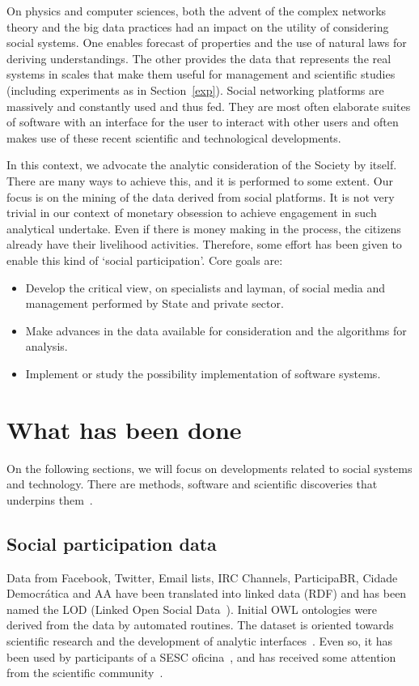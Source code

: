 \documentclass[letterpaper,10pt]{article}
\begin{document}
On physics and computer sciences,
both the advent of the complex networks
theory and the big data practices
had an impact on the utility of considering
social systems.
One enables forecast of properties
and the use of natural laws for deriving understandings.
The other provides the data that represents the real systems
in scales that make them useful for management and
scientific studies (including experiments as in Section~\ref{exp}).
Social networking platforms are massively and constantly used and thus fed.
They are most often elaborate suites of software with
an interface for the user to interact with other users
and often makes use of these recent scientific and technological
developments.

In this context,
we advocate the analytic consideration
of the Society by itself.
There are many ways to achieve this,
and it is performed to some extent.
Our focus is on the mining of the data
derived from social platforms.
It is not very trivial in our context
of monetary obsession to achieve engagement
in such analytical undertake.
Even if there is money making in the process,
the citizens already have their livelihood activities.
Therefore, some effort has been given to
enable this kind of `social participation'.
Core goals are:
\begin{itemize}
	\item Develop the critical view, on specialists and layman,
		of social media and
		management performed by State and private sector.
	\item Make advances in the data available for consideration
		and the algorithms for analysis.
	\item Implement or study the possibility implementation
		of software systems.
\end{itemize}

\section{What has been done}
On the following sections, we will focus on
developments related to social systems and technology.
There are methods, software and scientific discoveries
that underpins them~\cite{stab,tese,kolm}.

\subsection{Social participation data}
Data from Facebook, Twitter, Email lists, IRC Channels, ParticipaBR,
Cidade Democrática and AA have been translated into linked data (RDF)
and has been named the LOD (Linked Open Social Data~\cite{lod}).
Initial OWL ontologies were derived from the data by automated routines.
The dataset is oriented towards scientific research
and the development of analytic interfaces~\cite{p1,p2,p3,p4,p5}.
Even so, it has been used by participants of a SESC oficina~\cite{sesc},
and has received some attention from the scientific community~\cite{nexos,tese}.
\end{document}
